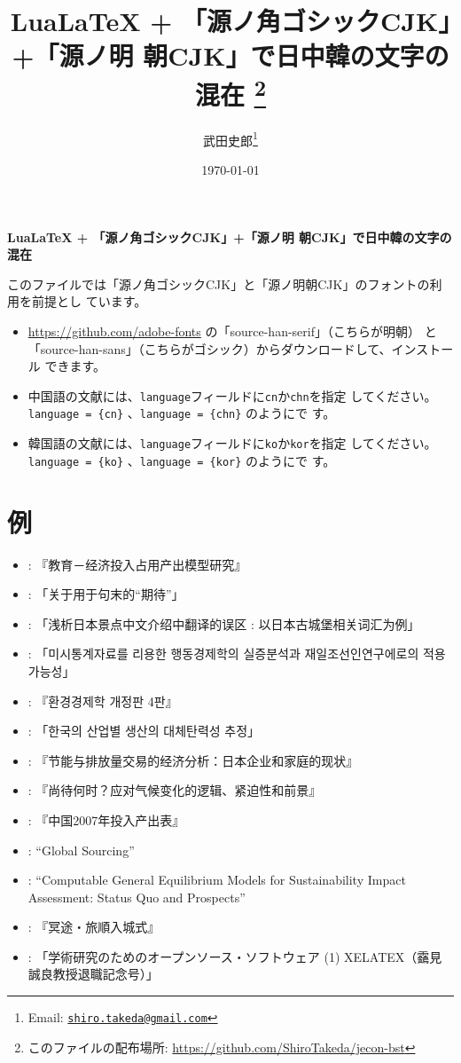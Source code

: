 \documentclass{ltjsarticle}
\title{\textbf{LuaLaTeX + 「源ノ角ゴシックCJK」+「源ノ明
 朝CJK」で日中韓の文字の混在}
\thanks{このファイルの配布場所: \url{https://github.com/ShiroTakeda/jecon-bst}}
}
\author{武田史郎\thanks{Email:
\texttt{\href{mailto:shiro.takeda@gmail.com}{shiro.takeda@gmail.com}}}}
\date{\today}
\begin{document}

\begin{flushleft}
{\Large \textbf{LuaLaTeX + 「源ノ角ゴシックCJK」+「源ノ明
 朝CJK」で日中韓の文字の混在}} 
\end{flushleft}

\vspace*{1em}

このファイルでは「源ノ角ゴシックCJK」と「源ノ明朝CJK」のフォントの利用を前提とし
ています。
\begin{itemize}
 \item \url{https://github.com/adobe-fonts} の「source-han-serif」（こちらが明朝）
       と「source-han-sans」（こちらがゴシック）からダウンロードして、インストール
       できます。
 \item 中国語の文献には、\verb|language|フィールドに\verb|cn|か\verb|chn|を指定
       してください。\verb|language = {cn}| 、\verb|language = {chn}| のようにで
       す。
 \item 韓国語の文献には、\verb|language|フィールドに\verb|ko|か\verb|kor|を指定
       してください。\verb|language = {ko}| 、\verb|language = {kor}| のようにで
       す。
\end{itemize}

\section{例}
\begin{itemize}
 \item \citet{zhang_IO_2009}: 『教育－经济投入占用产出模型研究』
 \item \citet{40022221997}: 「关于用于句末的``期待''」
 \item \citet{40022198771}: 「浅析日本景点中文介绍中翻译的误区 : 以日本古城堡相关词汇为例」
 \item \citet{40022308104}: 「미시통계자료를 리용한 행동경제학의 실증분석과 재일조선인연구에로의 적용가능성」
 \item \citet{gwon-osang-env-econ-2020}: 『환경경제학 개정판 4판』
 \item \citet{Seong-Tae_Kim_2011}: 「한국의 산업별 생산의 대체탄력성 추정」
 \item \citet{arimura-takeda-energy-2017}: 『节能与排放量交易的经济分析：日本企业和家庭的现状』
 \item \citet{Stern_2016:chn}: 『尚待何时？应对气候变化的逻辑、紧迫性和前景』
 \item \citet{china-io-2007}: 『中国2007年投入产出表』
 \item \citet{Stokey2004}: ``Global Sourcing''
 \item \citet{Bohringer2006}: ``Computable General Equilibrium Models for
       Sustainability Impact Assessment: Status Quo and Prospects''
 \item \citet{内田90}: 『冥途・旅順入城式』
 \item \citet{120005614155}: 「学術研究のためのオープンソース・ソフトウェア (1)
       XELATEX（靎見誠良教授退職記念号）」
\end{itemize}
\end{document}
